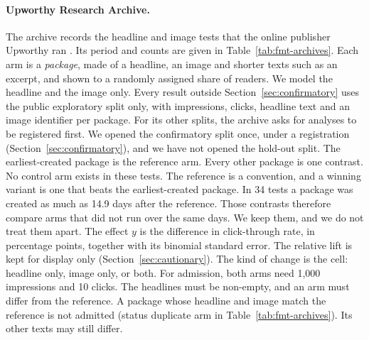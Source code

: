 \documentclass[sigconf,nonacm]{acmart}
\begin{document}
\paragraph{Upworthy Research Archive.} The archive records the headline and image tests that the online publisher Upworthy ran \cite{matias2021upworthy}. Its period and counts are given in Table~\ref{tab:fmt-archives}. Each arm is a \emph{package}, made of a headline, an image and shorter texts such as an excerpt, and shown to a randomly assigned share of readers. We model the headline and the image only. Every result outside Section~\ref{sec:confirmatory} uses the public exploratory split only, with impressions, clicks, headline text and an image identifier per package. For its other splits, the archive asks for analyses to be registered first. We opened the confirmatory split once, under a registration (Section~\ref{sec:confirmatory}), and we have not opened the hold-out split. The earliest-created package is the reference arm. Every other package is one contrast. No control arm exists in these tests. The reference is a convention, and a winning variant is one that beats the earliest-created package.
In 34 tests a package was created as much as 14.9 days after the reference. Those contrasts therefore compare arms that did not run over the same days. We keep them, and we do not treat them apart.
The effect $y$ is the difference in click-through rate, in percentage points, together with its binomial standard error. The relative lift is kept for display only (Section~\ref{sec:cautionary}). The kind of change is the cell: headline only, image only, or both.
For admission, both arms need 1,000 impressions and 10 clicks. The headlines must be non-empty, and an arm must differ from the reference. A package whose headline and image match the reference is not admitted (status duplicate arm in Table~\ref{tab:fmt-archives}). Its other texts may still differ.
\end{document}
